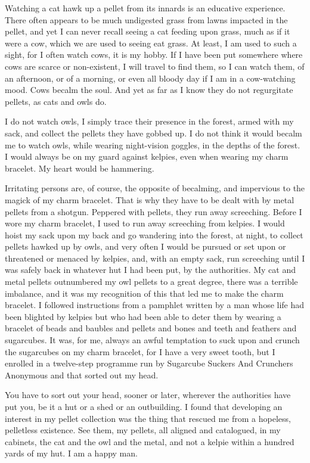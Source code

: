 Watching a cat hawk up a pellet from its innards is an educative experience. There often appears to be much undigested grass from lawns impacted in the pellet, and yet I can never recall seeing a cat feeding upon grass, much as if it were a cow, which we are used to seeing eat grass. At least, I am used to such a sight, for I often watch cows, it is my hobby. If I have been put somewhere where cows are scarce or non-existent, I will travel to find them, so I can watch them, of an afternoon, or of a morning, or even all bloody day if I am in a cow-watching mood. Cows becalm the soul. And yet as far as I know they do not regurgitate pellets, as cats and owls do.

I do not watch owls, I simply trace their presence in the forest, armed with my sack, and collect the pellets they have gobbed up. I do not think it would becalm me to watch owls, while wearing night-vision goggles, in the depths of the forest. I would always be on my guard against kelpies, even when wearing my charm bracelet. My heart would be hammering.

Irritating persons are, of course, the opposite of becalming, and impervious to the magick of my charm bracelet. That is why they have to be dealt with by metal pellets from a shotgun. Peppered with pellets, they run away screeching. Before I wore my charm bracelet, I used to run away screeching from kelpies. I would hoist my sack upon my back and go wandering into the forest, at night, to collect pellets hawked up by owls, and very often I would be pursued or set upon or threatened or menaced by kelpies, and, with an empty sack, run screeching until I was safely back in whatever hut I had been put, by the authorities. My cat and metal pellets outnumbered my owl pellets to a great degree, there was a terrible imbalance, and it was my recognition of this that led me to make the charm bracelet. I followed instructions from a pamphlet written by a man whose life had been blighted by kelpies but who had been able to deter them by wearing a bracelet of beads and baubles and pellets and bones and teeth and feathers and sugarcubes. It was, for me, always an awful temptation to suck upon and crunch the sugarcubes on my charm bracelet, for I have a very sweet tooth, but I enrolled in a twelve-step programme run by Sugarcube Suckers And Crunchers Anonymous and that sorted out my head.

You have to sort out your head, sooner or later, wherever the authorities have put you, be it a hut or a shed or an outbuilding. I found that developing an interest in my pellet collection was the thing that rescued me from a hopeless, pelletless existence. See them, my pellets, all aligned and catalogued, in my cabinets, the cat and the owl and the metal, and not a kelpie within a hundred yards of my hut. I am a happy man.